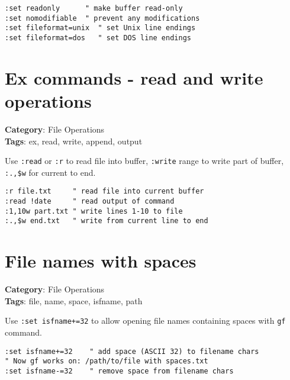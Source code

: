 {{{{{{\begin{Exa*}{}
\begin{Verbatim}[fontsize=\footnotesize, breaklines, breakanywhere]
:set readonly      " make buffer read-only
:set nomodifiable  " prevent any modifications
:set fileformat=unix  " set Unix line endings
:set fileformat=dos   " set DOS line endings
\end{Verbatim}
\end{Exa*}

\section{Ex commands - read and write operations}

\textbf{Category}: File Operations\\ \textbf{Tags}: ex, read, write, append, output
\vspace{0.5cm}

Use {\footnotesize \Verb§:read§} or {\footnotesize \Verb§:r§} to read file into buffer, {\footnotesize \Verb§:write§} range to write part of buffer, {\footnotesize \Verb§:.,$w§} for current to end.

\begin{Exa*}{}
\begin{Verbatim}[fontsize=\footnotesize, breaklines, breakanywhere]
:r file.txt     " read file into current buffer
:read !date     " read output of command
:1,10w part.txt " write lines 1-10 to file
:.,$w end.txt   " write from current line to end
\end{Verbatim}
\end{Exa*}

\section{File names with spaces}

\textbf{Category}: File Operations\\ \textbf{Tags}: file, name, space, isfname, path
\vspace{0.5cm}

Use {\footnotesize \Verb§:set isfname+=32§} to allow opening file names containing spaces with {\footnotesize \Verb§gf§} command.

\begin{Exa*}{}
\begin{Verbatim}[fontsize=\footnotesize, breaklines, breakanywhere]
:set isfname+=32    " add space (ASCII 32) to filename chars
" Now gf works on: /path/to/file with spaces.txt
:set isfname-=32    " remove space from filename chars
\end{Verbatim}
\end{Exa*}

}}}}}}
